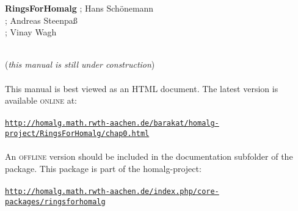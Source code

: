 \documentclass[a4paper,11pt]{report}
\newcommand{\maintitlesize}{\fontsize{50}{55}\selectfont}
\begin{document}
\begin{titlepage}
\begin{center}{\maintitlesize \textbf{\textsf{RingsForHomalg}\mbox{}}}
{    ; Hans Sch{\"o}nemann\\
    ; Andreas Steenpa{\ss}\\
    ; Vinay Wagh\\
    }
\mbox{}\\[2cm]
\begin{minipage}{12cm}\noindent
(\emph{this manual is still under construction}) \\
\\
 This manual is best viewed as an \textsc{HTML} document. The latest version is available \textsc{online} at: \\
\\
 \href{http://homalg.math.rwth-aachen.de/~barakat/homalg-project/RingsForHomalg/chap0.html} {\texttt{http://homalg.math.rwth-aachen.de/\texttt{}barakat/homalg-project/RingsForHomalg/chap0.html}} \\
\\
 An \textsc{offline} version should be included in the documentation subfolder of the package. This
package is part of the \textsf{homalg}-project: \\
\\
 \href{http://homalg.math.rwth-aachen.de/index.php/core-packages/ringsforhomalg} {\texttt{http://homalg.math.rwth-aachen.de/index.php/core-packages/ringsforhomalg}} \end{minipage}

\end{center}\vfill


\end{titlepage}
\end{document}
